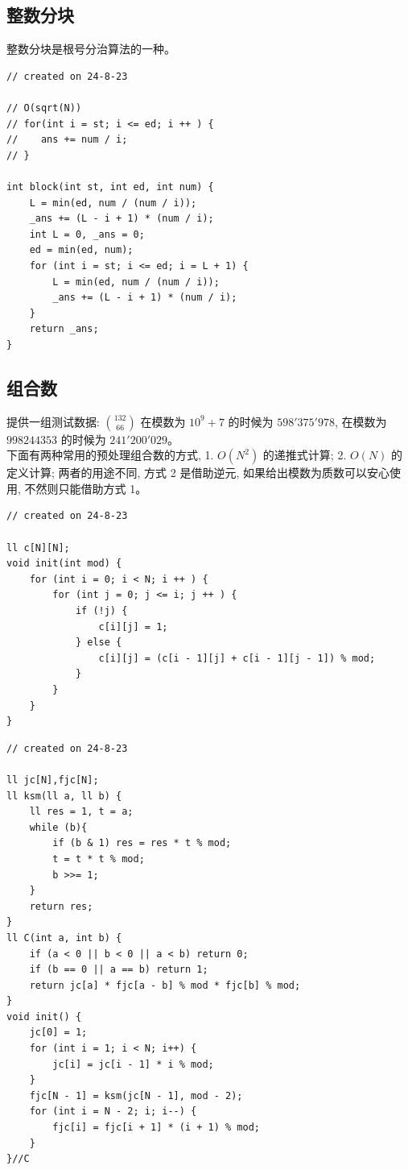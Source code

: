 \documentclass[a4paper,12pt]{article}
\begin{document}
\subsection{整数分块}

\noindent 整数分块是根号分治算法的一种。

\begin{lstlisting}
// created on 24-8-23

// O(sqrt(N))
// for(int i = st; i <= ed; i ++ ) {
//    ans += num / i;
// }

int block(int st, int ed, int num) {
    L = min(ed, num / (num / i));
    _ans += (L - i + 1) * (num / i);
    int L = 0, _ans = 0;
    ed = min(ed, num);
    for (int i = st; i <= ed; i = L + 1) {   
        L = min(ed, num / (num / i));
        _ans += (L - i + 1) * (num / i);
    }
    return _ans;
}
\end{lstlisting}

\subsection{组合数}

\noindent 提供一组测试数据: $\binom{132}{66}$ 在模数为 $10^9 + 7$ 的时候为 $598'375'978$,
在模数为 $998244353$ 的时候为 $241'200'029$。\\

\noindent 下面有两种常用的预处理组合数的方式, 1. $O(N^2)$ 的递推式计算; 2. $O(N)$ 的定义计算;
两者的用途不同, 方式 2 是借助逆元, 如果给出模数为质数可以安心使用, 不然则只能借助方式 1。

\begin{lstlisting}
// created on 24-8-23

ll c[N][N];
void init(int mod) {
    for (int i = 0; i < N; i ++ ) {
        for (int j = 0; j <= i; j ++ ) {
            if (!j) {
                c[i][j] = 1;
            } else {
                c[i][j] = (c[i - 1][j] + c[i - 1][j - 1]) % mod;
            }
        }
    }
}
\end{lstlisting}

\begin{lstlisting}
// created on 24-8-23

ll jc[N],fjc[N];
ll ksm(ll a, ll b) {
    ll res = 1, t = a;
    while (b){
        if (b & 1) res = res * t % mod;
        t = t * t % mod;
        b >>= 1;
    }
    return res;
}
ll C(int a, int b) {
    if (a < 0 || b < 0 || a < b) return 0;
    if (b == 0 || a == b) return 1;
    return jc[a] * fjc[a - b] % mod * fjc[b] % mod;
}
void init() {
    jc[0] = 1;
    for (int i = 1; i < N; i++) {
        jc[i] = jc[i - 1] * i % mod;
    }
    fjc[N - 1] = ksm(jc[N - 1], mod - 2);
    for (int i = N - 2; i; i--) {
        fjc[i] = fjc[i + 1] * (i + 1) % mod;
    }
}//C
\end{lstlisting}
\end{document}
